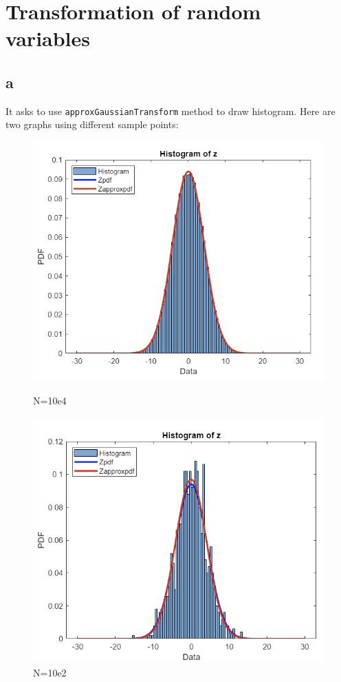 \section{Transformation of random variables}
\subsection{a}

It asks to use \texttt{approxGaussianTransform} method to draw histogram. Here are two graphs using different sample points:

\begin{figure}[H]
  \begin{minipage}[t]{0.48\textwidth}
  \centering
  \includegraphics[width=\textwidth]{images/image.png.png}
  \caption{N=10e4}
  \label{2a}
  \end{minipage}
  \hfill
  \begin{minipage}[t]{0.48\textwidth}
  \centering
  \includegraphics[width=\textwidth]{images/n=10e2.png}
  \caption{N=10e2}
  \label{2ab}
  \end{minipage}
  \end{figure}
  

